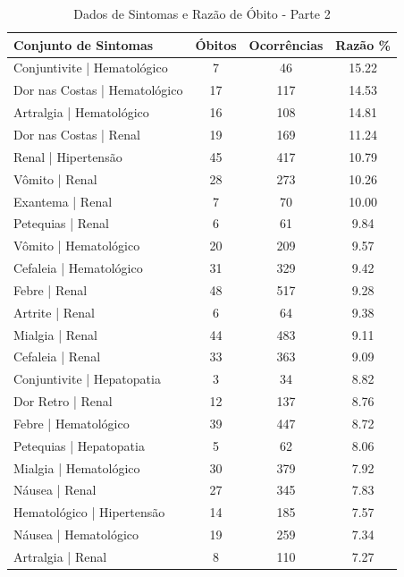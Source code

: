 \documentclass[a4paper,12pt]{article}
\begin{document}
\begin{table}[H]
    \centering
    \caption{Dados de Sintomas e Razão de Óbito - Parte 2}
    \begin{tabular}{@{}lccc@{}}
        \toprule
        \textbf{Conjunto de Sintomas} & \textbf{Óbitos} & \textbf{Ocorrências} & \textbf{Razão \%} \\ 
        \midrule
        Conjuntivite | Hematológico & 7 & 46 & 15.22 \\
        Dor nas Costas | Hematológico & 17 & 117 & 14.53 \\
        Artralgia | Hematológico & 16 & 108 & 14.81 \\
        Dor nas Costas | Renal & 19 & 169 & 11.24 \\
        Renal | Hipertensão & 45 & 417 & 10.79 \\
        Vômito | Renal & 28 & 273 & 10.26 \\
        Exantema | Renal & 7 & 70 & 10.00 \\
        Petequias | Renal & 6 & 61 & 9.84 \\
        Vômito | Hematológico & 20 & 209 & 9.57 \\
        Cefaleia | Hematológico & 31 & 329 & 9.42 \\
        Febre | Renal & 48 & 517 & 9.28 \\
        Artrite | Renal & 6 & 64 & 9.38 \\
        Mialgia | Renal & 44 & 483 & 9.11 \\
        Cefaleia | Renal & 33 & 363 & 9.09 \\
        Conjuntivite | Hepatopatia & 3 & 34 & 8.82 \\
        Dor Retro | Renal & 12 & 137 & 8.76 \\
        Febre | Hematológico & 39 & 447 & 8.72 \\
        Petequias | Hepatopatia & 5 & 62 & 8.06 \\
        Mialgia | Hematológico & 30 & 379 & 7.92 \\
        Náusea | Renal & 27 & 345 & 7.83 \\
        Hematológico | Hipertensão & 14 & 185 & 7.57 \\
        Náusea | Hematológico & 19 & 259 & 7.34 \\
        Artralgia | Renal & 8 & 110 & 7.27 \\
        \bottomrule
    \end{tabular}
    \label{tab:symptom_data_2}
\end{table}
\end{document}
